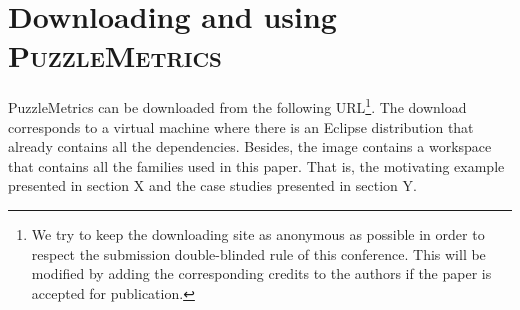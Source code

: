 \section{Downloading and using \textsc{PuzzleMetrics}}
\label{sec:puzzlemetrics}

PuzzleMetrics can be downloaded from the following URL\footnote{We try to keep the downloading site as anonymous as possible in order to respect the submission double-blinded rule of this conference. This will be modified by adding the corresponding credits to the authors if the paper is accepted for publication.}. The download corresponds to a virtual machine where there is an Eclipse distribution that already contains all the dependencies. Besides, the image contains a workspace that contains all the families used in this paper. That is, the motivating example presented in section X and the case studies presented in section Y.  

